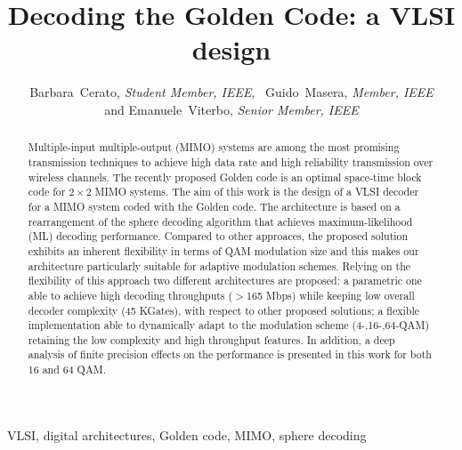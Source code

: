 \documentclass[12pt,onecolumn,draftclsnofoot]{IEEEtran}
\begin{document}
\title{Decoding the Golden Code: a VLSI design}
\author{Barbara~Cerato, {\em Student Member, IEEE},~ Guido~Masera, {\em Member,
IEEE}\\ and Emanuele~Viterbo, {\em Senior Member, IEEE}}






\maketitle


\begin{abstract}
Multiple-input multiple-output (MIMO) systems are among the most
promising transmission techniques to achieve high data rate and high
reliability transmission over wireless channels. The recently
proposed Golden code is an optimal space-time block code for $2\times 2$
MIMO systems. The aim of this work is the design of a VLSI decoder for
a MIMO system coded with the Golden code. The architecture is based
on a rearrangement of the sphere decoding algorithm that achieves
maximum-likelihood (ML) decoding performance. Compared to other approaces,
the proposed  solution exhibits an inherent flexibility in terms of
QAM modulation size and this makes our architecture 
particularly suitable for adaptive modulation schemes.
Relying on the flexibility of this
approach two different architectures are proposed: a
parametric one able to achieve high decoding throughputs
($>$165 Mbps) while keeping low overall decoder complexity (45 KGates),
 with respect to other proposed solutions; a flexible
implementation able to dynamically adapt to the modulation scheme
(4-,16-,64-QAM) retaining the low complexity and high throughput
features. In addition, a deep analysis of finite precision effects
on the performance is presented in this work for both 16 and 64 QAM.

\end{abstract}

\begin{keywords}
VLSI, digital architectures, Golden code, MIMO, sphere decoding
\end{keywords}


\IEEEpeerreviewmaketitle
\end{document}
